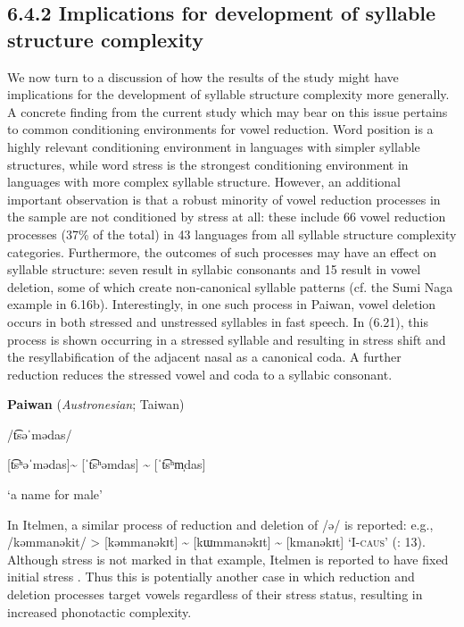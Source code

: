 \subsection{6.4.2 Implications for development of syllable structure complexity}

  We now turn to a discussion of how the results of the study might have implications for the development of syllable structure complexity more generally. A concrete finding from the current study which may bear on this issue pertains to common conditioning environments for vowel reduction. Word position is a highly relevant conditioning environment in languages with simpler syllable structures, while word stress is the strongest conditioning environment in languages with more complex syllable structure. However, an additional important observation is that a robust minority of vowel reduction processes in the sample are not conditioned by stress at all: these include 66 vowel reduction processes (37\% of the total) in 43 languages from all syllable structure complexity categories. Furthermore, the outcomes of such processes may have an effect on syllable structure: seven result in syllabic consonants and 15 result in vowel deletion, some of which create non-canonical syllable patterns (cf. the Sumi Naga example in 6.16b). Interestingly, in one such process in Paiwan, vowel deletion occurs in both stressed and unstressed syllables in fast speech. In (6.21), this process is shown occurring in a stressed syllable and resulting in stress shift and the resyllabification of the adjacent nasal as a canonical coda. A further reduction reduces the stressed vowel and coda to a syllabic consonant.

\ea\label{ex:(6.21)}
  \textbf{Paiwan} (\textit{Austronesian}; Taiwan)

/t͡səˈmədas/

[t͡sʰəˈmədas]{\textasciitilde} [ˈt͡sʰəmdas] {\textasciitilde} [ˈt͡sʰm̩das]

‘a name for male’

\citep[42]{Chang2006}
\z

In Itelmen, a similar process of reduction and deletion of /ə/ is reported: e.g., /kəmmanəkit/ > [kəmmanəkɪt] {\textasciitilde} [kɯmmanəkɪt] {\textasciitilde} [kmanəkɪt] ‘I-\textsc{caus}’ (\citealt{GeorgVolodin1999}: 13). Although stress is not marked in that example, Itelmen is reported to have fixed initial stress \citep[6]{Bobaljik2006}. Thus this is potentially another case in which reduction and deletion processes target vowels regardless of their stress status, resulting in increased phonotactic complexity. 


